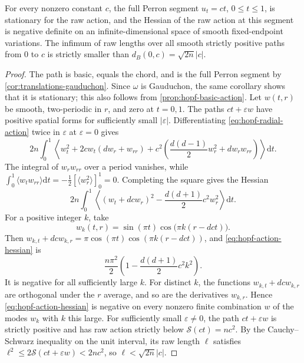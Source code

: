 \begin{theorem}\label{thm:hopf-action-saddle}
For every nonzero constant $c$, the full Perron segment $u_t=ct$, $0\leq t\leq1$, is stationary for the raw action, and the Hessian of the raw action at this segment is negative definite on an infinite-dimensional space of smooth fixed-endpoint variations. The infimum of raw lengths over all smooth strictly positive paths from $0$ to $c$ is strictly smaller than $d_B(0,c)=\sqrt{2n}|c|$.
\end{theorem}
\begin{proof}
The path is basic, equals the chord, and is the full Perron segment by \cref{cor:translations-gauduchon}. Since $\omega$ is Gauduchon, the same corollary shows that it is stationary; this also follows from \cref{prop:hopf-basic-action}.
Let $w(t,r)$ be smooth, two-periodic in $r$, and zero at $t=0,1$. The paths $ct+\varepsilon w$ have positive spatial forms for sufficiently small $|\varepsilon|$. Differentiating \eqref{eq:hopf-radial-action} twice in $\varepsilon$ at $\varepsilon=0$ gives
\[
 2n\int_0^1\left\langle
 w_t^2+2cw_t(dw_r+w_{rr})
 +c^2\left(\frac{d(d-1)}2w_r^2+dw_rw_{rr}\right)
 \right\rangle\mathrm dt.
\]
The integral of $w_rw_{rr}$ over a period vanishes, while
$\int_0^1\langle w_tw_{rr}\rangle\mathrm dt
=-\frac12[\langle w_r^2\rangle]_0^1=0$.
Completing the square gives the Hessian
\begin{equation}\label{eq:hopf-action-hessian}
 2n\int_0^1\left\langle
 (w_t+dcw_r)^2-\frac{d(d+1)}2c^2w_r^2
 \right\rangle\mathrm dt.
\end{equation}
For a positive integer $k$, take
\[
 w_k(t,r)=\sin(\pi t)\cos\bigl(\pi k(r-dct)\bigr).
\]
Then $w_{k,t}+dcw_{k,r}=\pi\cos(\pi t)\cos(\pi k(r-dct))$, and \eqref{eq:hopf-action-hessian} is
\[
 \frac{n\pi^2}2\left(1-\frac{d(d+1)}2c^2k^2\right).
\]
It is negative for all sufficiently large $k$. For distinct $k$, the functions $w_{k,t}+dcw_{k,r}$ are orthogonal under the $r$ average, and so are the derivatives $w_{k,r}$. Hence \eqref{eq:hopf-action-hessian} is negative on every nonzero finite combination $w$ of the modes $w_k$ with $k$ this large. For sufficiently small $\varepsilon\neq0$, the path $ct+\varepsilon w$ is strictly positive and has raw action strictly below $\mathscr S(ct)=nc^2$. By the Cauchy--Schwarz inequality on the unit interval, its raw length $\ell$ satisfies $\ell^2\leq2\mathscr S(ct+\varepsilon w)<2nc^2$, so $\ell<\sqrt{2n}|c|$.
\end{proof}

